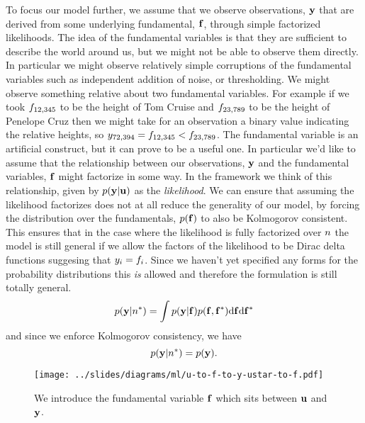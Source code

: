 \documentclass[a4paperpaper,]{article}
\begin{document}
To focus our model further, we assume that we observe observations,
\(\mathbf{ y}\) that are derived from some underlying fundamental,
\(\mathbf{ f}\), through simple factorized likelihoods. The
idea of the fundamental variables is that they are sufficient to
describe the world around us, but we might not be able to observe them
directly. In particular we might observe relatively simple corruptions
of the fundamental variables such as independent addition of noise, or
thresholding. We might observe something relative about two fundamental
variables. For example if we took \(f_{12,345}\) to be
the height of Tom Cruise and \(f_{23,789}\) to be the
height of Penelope Cruz then we might take for an observation a binary
value indicating the relative heights, so
\(y_{72,394} = f_{12,345} < f_{23,789}\).
The fundamental variable is an artificial construct, but it can prove to
be a useful one. In particular we'd like to assume that the relationship
between our observations, \(\mathbf{ y}\) and the fundamental variables,
\(\mathbf{ f}\) might factorize in some way. In the framework
we think of this relationship, given by
\(p(\mathbf{ y}|\mathbf{ u})\) as the \emph{likelihood}. We can
ensure that assuming the likelihood factorizes does not at all reduce
the generality of our model, by forcing the distribution over the
fundamentals, \(p(\mathbf{ f})\) to also be Kolmogorov
consistent. This ensures that in the case where the likelihood is fully
factorized over \(n\) the model is still general if we allow the
factors of the likelihood to be Dirac delta functions suggesing that
\(y_i = f_i\). Since we haven't yet specified
any forms for the probability distributions this \emph{is} allowed and
therefore the formulation is still totally general. \[
p(\mathbf{ y}|n^*) = \int p(\mathbf{ y}|\mathbf{ f}) p(\mathbf{ f}, \mathbf{ f}^*)\text{d}\mathbf{ f} \text{d}\mathbf{ f}^*
\] and since we enforce Kolmogorov consistency, we have \[
p(\mathbf{ y}|n^*) = p(\mathbf{ y}).
\]

\begin{figure}[htb]
\texttt{[image: ../slides/diagrams/ml/u-to-f-to-y-ustar-to-f.pdf]}


\caption{We introduce the fundamental variable $\mathbf{ f}$ which sits between $\mathbf{ u}$ and $\mathbf{ y}$.}
\label{u-to-f-to-y-ustar-to-f}
\end{figure}
\end{document}
